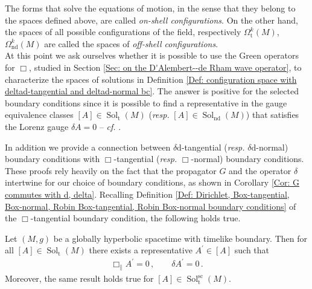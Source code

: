 The forms that solve the equations of motion, in the sense that they belong to the spaces defined above, are called \emph{on-shell configurations}. On the other hand, the spaces of all possible configurations of the field, respectively $\Omega_{\mathrm{t}}^k(M)$, $\Omega_{\mathrm{nd}}^k(M)$ are called the spaces of \emph{off-shell configurations}.\\


At this point we ask ourselves whether it is possible to use the Green operators for $\Box$, studied in Section \ref{Sec: on the D'Alembert--de Rham wave operator}, to characterize the spaces of solutions in Definition \ref{Def: configuration space with deltad-tangential and deltad-normal bc}. The answer is positive for the selected boundary conditions since it is possible to find a representative in the gauge equivalence classes $[A]\in\operatorname{Sol}_{\mathrm{t}}(M)$ (\textit{resp.} $[A]\in\operatorname{Sol}_{\mathrm{nd}}(M)$) that satisfies the Lorenz gauge $\delta A=0$ -- \textit{cf.} \cite[Lem. 7.2]{Benini-16}.

In addition we provide a connection between $\delta\mathrm{d}$-tangential (\textit{resp.} $\delta\mathrm{d}$-normal) boundary conditions with $\Box$-tangential (\textit{resp.} $\Box$-normal) boundary conditions.  These proofs rely heavily on the fact that the propagator $G$ and the operator $\delta$ intertwine for our choice of boundary conditions, as shown in Corollary \ref{Cor: G commutes with d, delta}. Recalling Definition \ref{Def: Dirichlet, Box-tangential, Box-normal, Robin Box-tangential, Robin Box-normal boundary conditions} of the $\Box$-tangential boundary condition, the following holds true.

\begin{proposition}\label{Prop: Lorentz gauge for deltad-tangential bc}
	Let $(M,g)$ be a globally hyperbolic spacetime with timelike boundary. Then for all $[A]\in\operatorname{Sol}_{\mathrm{t}}(M)$ there exists a representative $A^\prime\in [A]$ such that
	\begin{align}\label{Eqn: system of sins}
	\Box_\parallel A^\prime=0\,,\qquad
	\delta A^\prime=0\,.
	\end{align}
	Moreover, the same result holds true for $[A]\in\operatorname{Sol}_{\mathrm{t}}^{\mathrm{sc}}(M)$.
\end{proposition}

